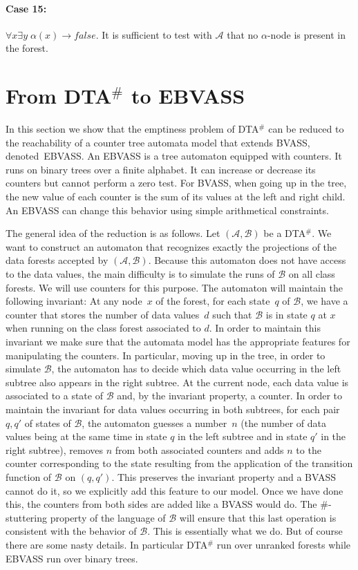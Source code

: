\documentclass{CSML}
\newcommand\bvass{\textup{BVASS}\xspace}
\newcommand\ebvass{\textup{EBVASS}\xspace}
\newcommand\dad{\textup{DTA}$^\#$\xspace}
\newcommand\Aa{\mathcal{A}}
\newcommand\Ba{\mathcal{B}}
\begin{document}
\paragraph{\bf Case 15:}
$\forall x \exists y\; \alpha(x) \to \mathit{false}$. 
It is sufficient to test with $\Aa$ that no $\alpha$-node is present in the forest.


\section{From \texorpdfstring{\dad}{DTA} to \texorpdfstring{\ebvass}{EBVASS}}\label{sec-dad-counter}

In this section we show that the emptiness problem of \dad can be reduced to
the reachability of a counter tree automata model that extends \bvass, denoted~\ebvass. 
An \ebvass is a tree automaton equipped with counters.  It runs on
binary trees over a finite alphabet.  It can increase or decrease its
counters but cannot perform a zero test.  For \bvass, when going up in the
tree, the new value of each counter is the sum of its values at the left and
right child. An \ebvass can change this behavior using simple arithmetical
constraints.


The general idea of the reduction is as follows. 
\label{sketch:sec-dad-counter}
Let $(\Aa,\Ba)$ be a \dad. 
We want to construct
an automaton that recognizes exactly the projections of the data forests
accepted by $(\Aa,\Ba)$. Because this automaton does not have access to the data
values, the main difficulty is to simulate the runs of $\Ba$ on all class
forests. We will use counters for this purpose. The automaton will maintain the
following invariant: At any node~$x$ of the forest, for each state~$q$ of
$\Ba$, we have a counter that stores the number of data values~$d$ such that
$\Ba$ is in state $q$ at $x$ when running on the class forest associated to
$d$. In order to maintain this invariant we make sure that the  automata
model has the appropriate features for manipulating the counters. In
particular, moving up in the tree, in order to simulate $\Ba$, 
the automaton has to decide which data value occurring 
in the left subtree also appears in the right subtree.  
At the current node, each data value is associated to a state of $\Ba$ 
and, by the invariant property, a counter. In order to maintain the invariant for data
values occurring in both subtrees, for each pair $q,q'$ of states of $\Ba$, the
automaton guesses a number~$n$ (the number of data values being at the same
time in state $q$ in the left subtree and in state $q'$ in the right subtree),
removes $n$ from both associated counters and adds $n$ to the counter
corresponding to the state resulting from the application of the transition function of
$\Ba$ on $(q,q')$. This preserves the invariant property and a BVASS cannot do it, so we explicitly add this feature to our model. Once we
have done this, the counters from both sides are added like a BVASS would do. 
The $\#$-stuttering property of the language of $\Ba$ will ensure that this last operation
is consistent with the behavior of $\Ba$.
This is essentially what we do. But of course there are some nasty details. In
particular \dad run over unranked forests while \ebvass run over binary trees.
\end{document}
